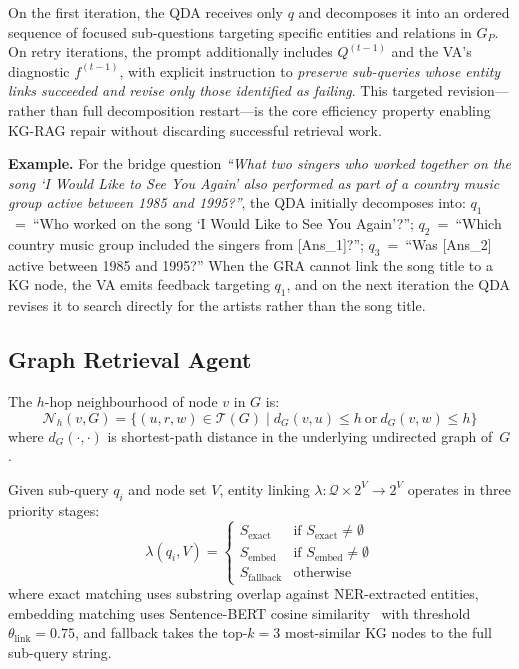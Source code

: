 \documentclass[runningheads]{llncs}
\newcommand{\calT}{\mathcal{T}}
\newcommand{\calQ}{\mathcal{Q}}
\newcommand{\calN}{\mathcal{N}}
\begin{document}
On the first iteration, the QDA receives only $q$ and decomposes it into an
ordered sequence of focused sub-questions targeting specific entities and
relations in $G_P$. On retry iterations, the prompt additionally includes
$Q^{(t-1)}$ and the VA's diagnostic $f^{(t-1)}$, with explicit instruction to
\emph{preserve sub-queries whose entity links succeeded and revise only those
identified as failing}. This targeted revision---rather than full decomposition
restart---is the core efficiency property enabling KG-RAG repair without
discarding successful retrieval work.

\textbf{Example.} For the bridge question \textit{``What two singers who
worked together on the song `I Would Like to See You Again' also performed as
part of a country music group active between 1985 and 1995?''}, the QDA
initially decomposes into:
$q_1$~=~``Who worked on the song `I Would Like to See You Again'?'';
$q_2$~=~``Which country music group included the singers from [Ans\_1]?'';
$q_3$~=~``Was [Ans\_2] active between 1985 and 1995?''
When the GRA cannot link the song title to a KG node, the VA emits feedback
targeting $q_1$, and on the next iteration the QDA revises it to search
directly for the artists rather than the song title.

\subsection{Graph Retrieval Agent}

\begin{definition}
The $h$-hop neighbourhood of node $v$ in $G$ is:
\begin{equation}
  \calN_h(v,G) = \bigl\{(u,r,w)\in\calT(G)\;\big|\;
    d_G(v,u)\leq h\ \text{or}\ d_G(v,w)\leq h\bigr\}
\end{equation}
where $d_G(\cdot,\cdot)$ is shortest-path distance in the underlying undirected
graph of~$G$.
\end{definition}

\begin{definition}
Given sub-query $q_i$ and node set $V$, entity linking
$\lambda:\calQ\times 2^V\rightarrow 2^V$ operates in three priority stages:
\begin{equation}
  \lambda(q_i,V) =
  \begin{cases}
    S_\text{exact}    & \text{if } S_\text{exact}    \neq \emptyset \\
    S_\text{embed}    & \text{if } S_\text{embed}    \neq \emptyset \\
    S_\text{fallback} & \text{otherwise}
  \end{cases}
  \label{eq:linking}
\end{equation}
where exact matching uses substring overlap against NER-extracted entities,
embedding matching uses Sentence-BERT cosine similarity~\cite{reimers2019sbert}
with threshold $\theta_\text{link}=0.75$, and fallback takes the top-$k=3$
most-similar KG nodes to the full sub-query string.
\end{definition}
\end{document}
